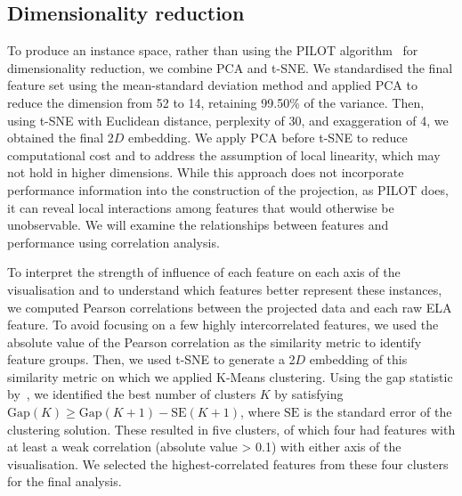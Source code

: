 \documentclass[acmsmall,screen,review,anonymous]{acmart}
\begin{document}
\subsection{Dimensionality reduction}\label{ssec:dimension_reduction}
To produce an instance space, rather than using the PILOT algorithm~\cite{SmithMiles2022} for dimensionality reduction, we combine PCA and t-SNE. We standardised the final feature set using the mean-standard deviation method and applied PCA to reduce the dimension from 52 to 14, retaining 99.50\% of the variance. Then, using t-SNE with Euclidean distance, perplexity of 30, and exaggeration of 4, we obtained the final 2$D$ embedding. We apply PCA before t-SNE to reduce computational cost and to address the assumption of local linearity, which may not hold in higher dimensions. While this approach does not incorporate performance information into the construction of the projection, as PILOT does, it can reveal local interactions among features that would otherwise be unobservable. We will examine the relationships between features and performance using correlation analysis.

To interpret the strength of influence of each feature on each axis of the visualisation and to understand which features better represent these instances, we computed Pearson correlations between the projected data and each raw ELA feature. To avoid focusing on a few highly intercorrelated features, we used the absolute value of the Pearson correlation as the similarity metric to identify feature groups. Then, we used t-SNE to generate a 2$D$ embedding of this similarity metric on which we applied K-Means clustering. Using the gap statistic by~\citet{tibshirani01gap}, we identified the best number of clusters $K$ by satisfying $\text{Gap}\left(K\right)\geq\text{Gap}\left(K+1\right)-\text{SE}\left(K+1\right)$, where $\text{SE}$ is the standard error of the clustering solution. These resulted in five clusters, of which four had features with at least a weak correlation (absolute value > 0.1) with either axis of the visualisation. We selected the highest-correlated features from these four clusters for the final analysis.

\end{document}
